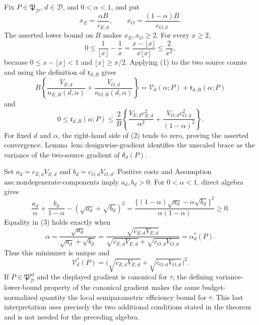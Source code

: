 Fix \(P\in\mathfrak P_{\mathcal D}\), \(d\in\mathcal D\), and \(0<\alpha<1\), and put
\[
x_E=\frac{\alpha B}{c_{E,d}},\qquad x_O=\frac{(1-\alpha)B}{c_{O,d}}.
\]
The asserted lower bound on \(B\) makes \(x_E,x_O\ge2\).  For every \(x\ge2\),
\[
0\le \frac1{\lfloor x\rfloor}-\frac1x
=\frac{x-\lfloor x\rfloor}{x\lfloor x\rfloor}
\le \frac2{x^2},                                                   \tag{1}
\]
because \(0\le x-\lfloor x\rfloor<1\) and \(\lfloor x\rfloor\ge x/2\).  Applying (1) to the two source counts and using the definition of \(\mathfrak r_{d,B}\) gives
\[
B\left\{\frac{V_{E,d}}{n_{E,B}(d,\alpha)}+
\frac{V_{O,d}}{n_{O,B}(d,\alpha)}\right\}
=\mathcal V_d(\alpha;P)+\mathfrak r_{d,B}(\alpha;P)
\]
and
\[
0\le\mathfrak r_{d,B}(\alpha;P)
\le \frac2B\left\{
\frac{V_{E,d}c_{E,d}^2}{\alpha^2}+
\frac{V_{O,d}c_{O,d}^2}{(1-\alpha)^2}\right\}.                    \tag{2}
\]
For fixed \(d\) and \(\alpha\), the right-hand side of (2) tends to zero, proving the asserted convergence.  Lemma~\(\mathrm{lem{:}designwise\text{-}gradient}\) identifies the unscaled brace as the variance of the two-source gradient of \(\theta_d(P)\).

Set \(a_d=c_{E,d}V_{E,d}\) and \(b_d=c_{O,d}V_{O,d}\).  Positive costs and Assumption~\(\mathrm{ass{:}nondegenerate\text{-}components}\) imply \(a_d,b_d>0\).  For \(0<\alpha<1\), direct algebra gives
\[
\frac{a_d}{\alpha}+\frac{b_d}{1-\alpha}
-(\sqrt{a_d}+\sqrt{b_d})^2
=\frac{\{(1-\alpha)\sqrt{a_d}-\alpha\sqrt{b_d}\}^2}
{\alpha(1-\alpha)}\ge0.                                           \tag{3}
\]
Equality in (3) holds exactly when
\[
\alpha=\frac{\sqrt{a_d}}{\sqrt{a_d}+\sqrt{b_d}}
=\frac{\sqrt{c_{E,d}V_{E,d}}}
{\sqrt{c_{E,d}V_{E,d}}+\sqrt{c_{O,d}V_{O,d}}}
=\alpha_d^*(P).
\]
Thus this minimizer is unique and
\[
\mathcal V_d^*(P)
=\bigl(\sqrt{c_{E,d}V_{E,d}}+\sqrt{c_{O,d}V_{O,d}}\bigr)^2.
\]
If \(P\in\mathfrak P_{\mathcal D}^{\mathrm{id}}\) and the displayed gradient is canonical for \(\tau\), the defining variance-lower-bound property of the canonical gradient makes the same budget-normalized quantity the local semiparametric efficiency bound for \(\tau\).  This last interpretation uses precisely the two additional conditions stated in the theorem and is not needed for the preceding algebra.